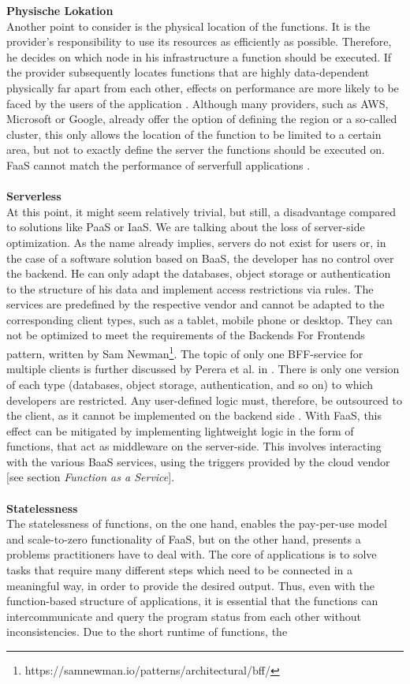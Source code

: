\documentclass[11pt]{article}
\begin{document}
\textbf{Physische Lokation}\\ Another point to consider is the physical location of the functions. It is the provider's responsibility to use its resources as efficiently as possible. Therefore, he decides on which node in his infrastructure a function should be executed. If the provider subsequently locates functions that are highly data-dependent physically far apart from each other, effects on performance are more likely to be faced by the users of the application \cite{shafiei2020serverless}. Although many providers, such as AWS, Microsoft or Google, already offer the option of defining the region or a so-called cluster, this only allows the location of the function to be limited to a certain area, but not to exactly define the server the functions should be executed on. FaaS cannot match the performance of serverfull applications \cite{shafiei2020serverless}.\\\\ \textbf{Serverless}\\ At this point, it might seem relatively trivial, but still, a disadvantage compared to solutions like PaaS or IaaS. We are talking about the loss of server-side optimization. As the name already implies, servers do not exist for users or, in the case of a software solution based on BaaS, the developer has no control over the backend. He can only adapt the databases, object storage or authentication to the structure of his data and implement access restrictions via rules. The services are predefined by the respective vendor and cannot be adapted to the corresponding client types, such as a tablet, mobile phone or desktop. They can not be optimized to meet the requirements of the \glqq Backends For Frontends\grqq{} pattern, written by Sam Newman\footnote{https://samnewman.io/patterns/architectural/bff/}. The topic of only one BFF-service for multiple clients is further discussed by Perera et al. in \cite{perera2018rule}. There is only one version of each type (databases, object storage, authentication, and so on) to which developers are restricted. Any user-defined logic must, therefore, be outsourced to the client, as it cannot be implemented on the backend side \cite{fowler2018serverless}. With FaaS, this effect can be mitigated by implementing lightweight logic in the form of functions, that act as middleware on the server-side. This involves interacting with the various BaaS services, using the triggers provided by the cloud vendor [see section \textit{Function as a Service}].\\\\ \textbf{Statelessness}\\ The statelessness of functions, on the one hand, enables the pay-per-use model and scale-to-zero functionality of FaaS, but on the other hand, presents a problems practitioners have to deal with. The core of applications is to solve tasks that require many different steps which need to be connected in a meaningful way, in order to provide the desired output. Thus, even with the function-based structure of applications, it is essential that the functions can intercommunicate and query the program status from each other without inconsistencies. Due to the short runtime of functions, the 
\end{document}
